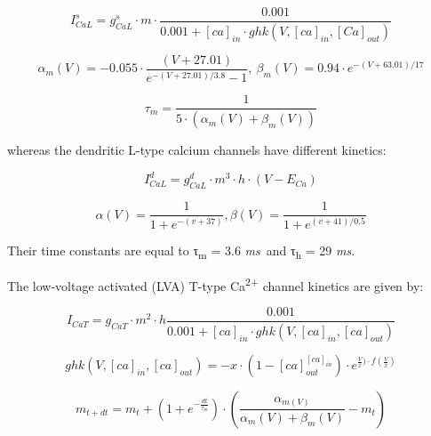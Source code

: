 \documentclass[a4paper]{article}
\begin{document}
\begin{equation}
I_{CaL}^s= g_{CaL}^s\cdot m\cdot
\frac{0.001 }{0.001 + [ca]_{in}\cdot
ghk(V, [ca]_{in}, [Ca]_{out})}
\end{equation}

\begin{equation}
α_m(V)=-0.055\cdot \frac{(V+27.01)}{e^{-(V+27.01)/3.8}-1} , \  β_m(V)=0.94\cdot e^{-(V+63.01)/17}
\end{equation}

\begin{equation}
τ_m=\frac {1}{5\cdot (α_m(V)+β_m(V))}
\end{equation}

whereas the dendritic L-type calcium channels have different kinetics: 


\begin{equation}
I_{CaL}^d= g_{CaL}^d \cdot m^3 \cdot h \cdot
(V-E_{Ca})
\end{equation}

\begin{equation}
α(V)=\frac {1}{1+e^{-(v+37)}},β(V)=\frac {1}{1+e^{(v+41)/0.5}}
\end{equation}


Their time constants are equal to τ\textsubscript{m}\textit{ }=\textit{ }3.6\textit{ ms}~and τ\textsubscript{h}\textit{
}=\textit{ }29\textit{ ms}.



The low-voltage activated (LVA) T-type Ca\textsuperscript{2+} channel kinetics are given by:


\begin{equation}
I_{CaT}= g_{CaT}\cdot m^2\cdot
h\frac{0.001 }{0.001+[ca]_{in}\cdot
ghk(V,[ca]_{in},[ca]_{out})}
\end{equation}

\begin{equation}
ghk(V, [ca]_{in}, [ca]_{out})=-x\cdot
(1 - [ca]_{out}^{[ca]_{in}})\cdot
e^{\frac {V} {x})\cdot f(\frac {V}{x})}
\end{equation}


\begin{equation}
m_{t+dt}=m_t+(1+e^{-\frac{dt}{τ_m}})\cdot
(\frac{α_{m(V)}}{α_m(V)+β_m(V)}-m_t)
\end{equation}
\end{document}
